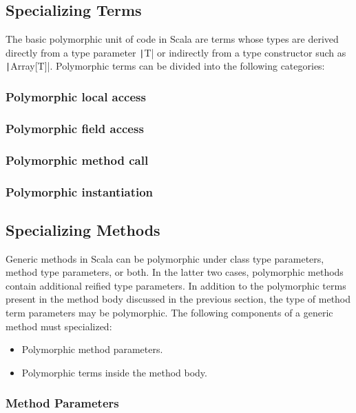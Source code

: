 \subsection{Specializing Terms}

The basic polymorphic unit of code in Scala are terms whose types are derived directly from a type parameter \texttt|T| or indirectly from a type constructor such as \texttt|Array[T]|.
Polymorphic terms can be divided into the following categories:

\subsubsection*{Polymorphic local access}
\subsubsection*{Polymorphic field access}
\subsubsection*{Polymorphic method call}
\subsubsection*{Polymorphic instantiation}


\subsection{Specializing Methods}

Generic methods in Scala can be polymorphic under class type parameters, method type parameters, or both. 
In the latter two cases, polymorphic methods contain additional reified type parameters. 
In addition to the polymorphic terms present in the method body discussed in the previous section, the type of method term parameters may be polymorphic. 
The following components of a generic method must specialized:

\begin{itemize}
	\item Polymorphic method parameters.
	\item Polymorphic terms inside the method body.
\end{itemize}


\subsubsection*{Method Parameters}

